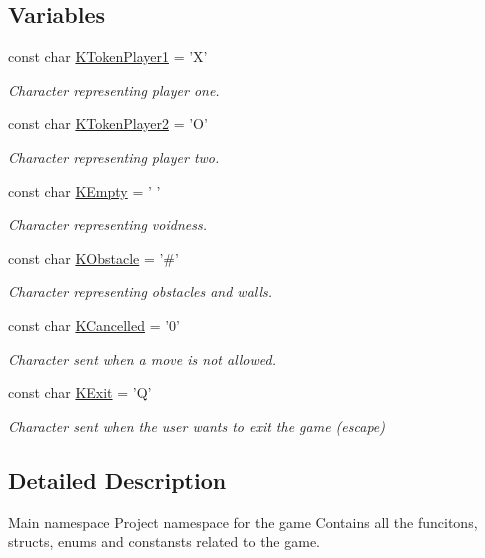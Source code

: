 \subsection*{Variables}
\begin{DoxyCompactItemize}
\item 
const char \hyperlink{namespace_chase_game_a8452e2d6de618e4ca7a9f76b082b52a4}{K\-Token\-Player1} = 'X'
\begin{DoxyCompactList}\small\item\em Character representing player one. \end{DoxyCompactList}\item 
const char \hyperlink{namespace_chase_game_ae27343407c21a8d6e3cf26b736bd5527}{K\-Token\-Player2} = 'O'
\begin{DoxyCompactList}\small\item\em Character representing player two. \end{DoxyCompactList}\item 
const char \hyperlink{namespace_chase_game_aa036d4de40188ba2e1aa36ab6cfaf1da}{K\-Empty} = ' '
\begin{DoxyCompactList}\small\item\em Character representing voidness. \end{DoxyCompactList}\item 
const char \hyperlink{namespace_chase_game_ad86181b2050b912dab9d69d2f0bea76e}{K\-Obstacle} = '\#'
\begin{DoxyCompactList}\small\item\em Character representing obstacles and walls. \end{DoxyCompactList}\item 
const char \hyperlink{namespace_chase_game_a12d6411bb9a72150acba6060bb1587e1}{K\-Cancelled} = '0'
\begin{DoxyCompactList}\small\item\em Character sent when a move is not allowed. \end{DoxyCompactList}\item 
const char \hyperlink{namespace_chase_game_a1f787138e31b0a9dc2fbaad3547b246a}{K\-Exit} = 'Q'
\begin{DoxyCompactList}\small\item\em Character sent when the user wants to exit the game (escape) \end{DoxyCompactList}\end{DoxyCompactItemize}


\subsection{Detailed Description}
Main namespace Project namespace for the game Contains all the funcitons, structs, enums and constansts related to the game. 


